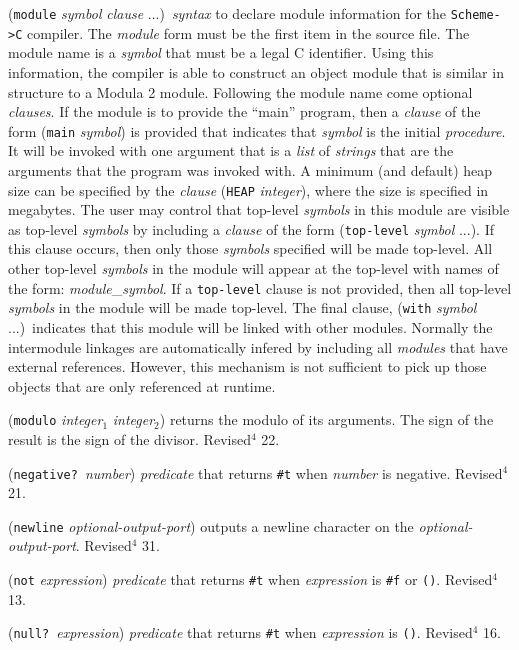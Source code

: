 \documentclass[10pt,twocolumn]{article}
\begin{document}
(\texttt{module} \emph{symbol} \emph{clause} ...)\ \emph{syntax} to declare module
information for the \texttt{Scheme->C} compiler.  The \emph{module} form must
be the first item in the source file.  The module name is a
\emph{symbol} that must be a legal C identifier.  Using this
information, the compiler is able to construct an object module that
is similar in structure to a Modula 2 module. Following the module
name come optional \emph{clauses}. If the module is to provide the
``main'' program, then a \emph{clause} of the form (\texttt{main} \emph{symbol})
is provided that indicates that \emph{symbol} is the initial
\emph{procedure}.  It will be invoked with one argument that is a
\emph{list} of \emph{strings} that are the arguments that the program was
invoked with.  A minimum (and default) heap size can be specified by
the \emph{clause} (\texttt{HEAP} \emph{integer}), where the size is specified in
megabytes.  The user may control that top-level \emph{symbols} in this
module are visible as top-level \emph{symbols} by including a \emph{clause}
of the form (\texttt{top-level} \emph{symbol} ...). If this clause occurs,
then only those \emph{symbols} specified will be made top-level. All
other top-level \emph{symbols} in the module will appear at the
top-level with names of the form: \emph{module}\_\emph{symbol}.  If a
\texttt{top-level} clause is not provided, then all top-level \emph{symbols}
in the module will be made top-level. The final clause, (\texttt{with}
\emph{symbol} ...)\ indicates that this module will be linked with other
modules.  Normally the intermodule linkages are automatically infered
by including all \emph{modules} that have external references. However,
this mechanism is not sufficient to pick up those objects that are
only referenced at runtime.

(\texttt{modulo} \emph{integer}$_1$ \emph{integer}$_2$) returns the modulo of its
arguments.  The sign of the result is the sign of the divisor.
Revised$^4$ 22.

(\texttt{negative?}\ \emph{number}) \emph{predicate} that returns \texttt{\#t} when
\emph{number} is negative.  Revised$^4$ 21.

(\texttt{newline} \emph{optional-output-port}) outputs a newline character on
the \emph{optional-output-port}.  Revised$^4$ 31.

(\texttt{not} \emph{expression}) \emph{predicate} that returns \texttt{\#t} when
\emph{expression} is \texttt{\#f} or \texttt{()}.  Revised$^4$ 13.

(\texttt{null?}\ \emph{expression}) \emph{predicate} that returns \texttt{\#t} when
\emph{expression} is \texttt{()}.  Revised$^4$ 16.
\end{document}
